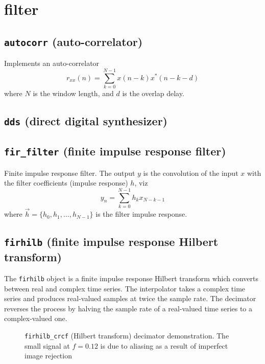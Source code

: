 % 
%
\section{filter}
\label{module:filter}

\subsection{{\tt autocorr} (auto-correlator)}
Implements an auto-correlator
\[
    r_{xx}(n) = \sum_{k=0}^{N-1} {x(n-k)x^*(n-k-d)}
\]
where $N$ is the window length, and $d$ is the overlap delay.

\subsection{{\tt dds} (direct digital synthesizer)}

\subsection{{\tt fir\_filter} (finite impulse response filter)}
Finite impulse response filter.
The output $y$ is the convolution of the input $x$ with the filter
coefficients (impulse response) $h$, viz
\[
    y_n = \sum_{k=0}^{N-1}{ h_k x_{N-k-1} }
\]
where $\vec{h} = \{h_0,h_1,\ldots,h_{N-1}\}$ is the filter impulse response.

\subsection{{\tt firhilb} (finite impulse response Hilbert transform)}
The {\tt firhilb} object is a finite impulse response Hilbert transform which
converts between real and complex time series.
The interpolator takes a complex time series and produces real-valued samples
at twice the sample rate.
The decimator reverses the process by halving the sample rate of a real-valued
time series to a complex-valued one.



\begin{figure}
\centering
{}
\caption{{\tt firhilb\_crcf} (Hilbert transform) decimator demonstration. The
small signal at $f=0.12$ is due to aliasing as a result of imperfect image
rejection}
\label{fig:module:filter:firhilb_crcf}
\end{figure}

